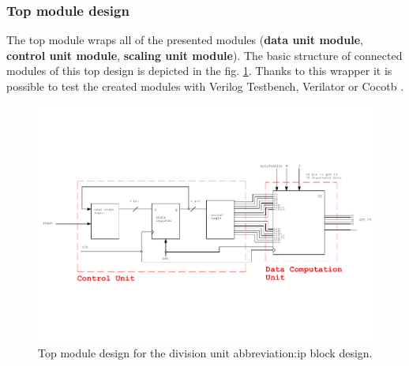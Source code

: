 \documentclass[a4paper, twoside, 11pt]{article}
\newcommand{\fbar}{\FloatBarrier}
\begin{document}
\subsubsection{Top module design}\label{subsubsec:division-top-module-design}
The top module wraps all of the presented modules (\textbf{data unit module}, \textbf{control unit module}, \textbf{scaling unit module}). The basic structure of connected modules of this top design is depicted in the fig. \ref{fig:division-top-module}. Thanks to this wrapper it is possible to test the created modules with Verilog Testbench, Verilator \cite{verilator} or Cocotb \cite{cocotb}.
\begin{figure}[htbp!]
  \centering
  \includegraphics[width=1\textwidth]{src/pdf/top-module.pdf}
   \caption{Top module design for the division unit \gls{abbreviation:ip} block design.}
  \label{fig:division-top-module}
\end{figure}



\fbar
\end{document}
